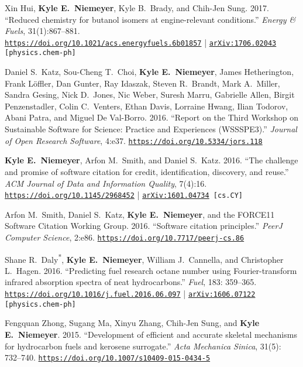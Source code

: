 \documentclass[margin,line,11pt]{res}
\makeatletter
\newlength{\bibhang}
\newlength{\bibsep}
 {\@listi \global\bibsep\itemsep \global\advance\bibsep by\parsep}
\newenvironment{bibenum*}
  {\renewcommand\labelenumi{\theenumi.}%
   \etaremune[
     topsep=0pt,
     itemsep=\bibsep,
     parsep=0pt,partopsep=0pt,
     itemindent=-\bibhang,
     leftmargin={\bibhang+\widthof{[999]}}]}
  {\endetaremune}
\newcommand*{\doi}[1]{\href{https://doi.org/#1}{\nolinkurl{https://doi.org/#1}}}
\makeatother
\begin{document}
\begin{resume}
\begin{bibenum*}
\item Xin Hui, \textbf{Kyle E.~Niemeyer}, Kyle B.~Brady, and Chih-Jen Sung.
2017.
``Reduced chemistry for butanol isomers at engine-relevant conditions.''
\textit{Energy \& Fuels}, 31(1):867--881. \\
\doi{10.1021/acs.energyfuels.6b01857} |
{\tt \href{https://arxiv.org/abs/1706.02043}{arXiv:1706.02043} [physics.chem-ph]}

\item Daniel S.~Katz, Sou-Cheng T.\ Choi, \textbf{Kyle E.~Niemeyer}, James Hetherington,
Frank L\"{o}ffler, Dan Gunter, Ray Idaszak, Steven R.\ Brandt, Mark A.\ Miller, Sandra Gesing,
Nick D.\ Jones, Nic Weber, Suresh Marru, Gabrielle Allen, Birgit Penzenstadler, Colin C.\ Venters,
Ethan Davis, Lorraine Hwang, Ilian Todorov, Abani Patra, and Miguel De Val-Borro.
2016.
``Report on the Third Workshop on Sustainable Software for Science: Practice and Experiences (WSSSPE3).''
\emph{Journal of Open Research Software}, 4:e37.
\doi{10.5334/jors.118}

\item \textbf{Kyle E.~Niemeyer}, Arfon M.\ Smith, and Daniel S.\ Katz.
2016.
``The challenge and promise of software citation for credit, identification, discovery, and reuse.''
\emph{ACM Journal of Data and Information Quality}, 7(4):16.
\doi{10.1145/2968452} |
{\tt \href{http://arxiv.org/abs/1601.04734}{arXiv:1601.04734} [cs.CY]}

\item Arfon M.~Smith, Daniel S.~Katz, \textbf{Kyle E.~Niemeyer}, and the FORCE11 Software Citation Working Group.
2016.
``Software citation principles.''
\emph{PeerJ Computer Science}, 2:e86.
\doi{10.7717/peerj-cs.86}

\item Shane R.~Daly\textsuperscript{*}, \textbf{Kyle E.~Niemeyer}, William J.~Cannella, and Christopher L.~Hagen.
2016.
``Predicting fuel research octane number using Fourier-transform infrared absorption spectra of neat hydrocarbons.''
\emph{Fuel}, 183: 359--365.
\doi{10.1016/j.fuel.2016.06.097} |
{\tt \href{http://arxiv.org/abs/1606.07122}{arXiv:1606.07122} [physics.chem-ph]}

\item Fengquan Zhong, Sugang Ma, Xinyu Zhang, Chih-Jen Sung, and \textbf{Kyle E.~Niemeyer}.
2015.
``Development of efficient and accurate skeletal mechanisms for hydrocarbon fuels and kerosene surrogate.''
\emph{Acta Mechanica Sinica}, 31(5): 732--740.
\doi{10.1007/s10409-015-0434-5}


\end{bibenum*}
\end{resume}
\end{document}

